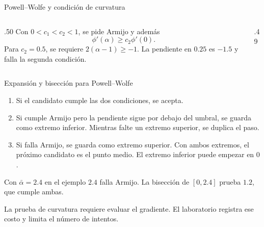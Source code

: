 \documentclass[aspectratio=169,12pt]{beamer}
\begin{document}
\begin{frame}{Powell--Wolfe y condición de curvatura}
\begin{columns}[c,onlytextwidth]
\begin{column}{.50\textwidth}
Con $0<c_1<c_2<1$, se pide Armijo y además
\[
 \phi'(\alpha)\ge c_2\phi'(0).
\]
Para $c_2=0.5$, se requiere $2(\alpha-1)\ge-1$.
La pendiente en $0.25$ es $-1.5$ y falla la segunda condición.
\medskip

\end{column}
\begin{column}{.49\textwidth}
\centering
{}
\end{column}
\end{columns}
\end{frame}

\begin{frame}{Expansión y bisección para Powell--Wolfe}
\begin{enumerate}
\item Si el candidato cumple las dos condiciones, se acepta.
\item Si cumple Armijo pero la pendiente sigue por debajo del umbral,
se guarda como extremo inferior. Mientras falte un extremo superior,
se duplica el paso.
\item Si falla Armijo, se guarda como extremo superior. Con ambos
extremos, el próximo candidato es el punto medio. El extremo inferior
puede empezar en $0$.
\end{enumerate}
\begin{exampleblock}{Con $\bar\alpha=2.4$ en el ejemplo}
$2.4$ falla Armijo. La bisección de $[0,2.4]$ prueba $1.2$, que cumple ambas.
\end{exampleblock}
La prueba de curvatura requiere evaluar el gradiente.
El laboratorio registra ese costo y limita el número de intentos.
\end{frame}
\end{document}
